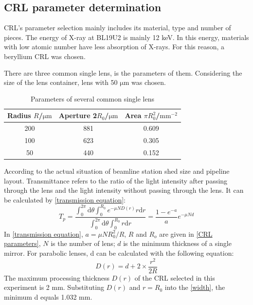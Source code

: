 \documentclass{Head}
\begin{document}
\subsection{CRL parameter determination}
CRL's parameter selection mainly includes its material, type and number of pieces.
The energy of X-ray at BL19U2 is mainly 12 keV.
In this energy, materials with low atomic number have less absorption of X-rays.
For this reason, a beryllium CRL was chosen.


There are three common single lens, is the parameters of them.
Considering the size of the lens container, lens with 50 $\mathrm{\mu m}$ was chosen.
\begin{table}
    \centering
    \caption{Parameters of several common single lens}
    \begin{tabular}{ccc}
        \toprule
        Radius $R$/$\mathrm{\mu m}$ & Aperture 2$R_0$/$\mathrm{\mu m}$ & Area $\pi R_0^2$/$\mathrm{mm^{-2}}$ \\
        \midrule
        200                         & 881                              & 0.609                               \\
        100                         & 623                              & 0.305                               \\
        50                          & 440                              & 0.152                               \\
        \bottomrule
    \end{tabular}
    \label{CRL parameters}
\end{table}

According to the actual situation of beamline station shed size and pipeline layout.
Transmittance refers to the ratio of the light intensity after passing through the lens and the light intensity without passing through the lens.
It can be calculated by \autoref{transmission equation}\cite{Lengeler:ht2006}:
\begin{equation}
    T_p=\frac{\int_0^{2\pi}\mathrm{d}\theta\int_0^{R_0}e^{-\mu ND(r)}r\mathrm{d}r}{\int_0^{2\pi}\mathrm{d}\theta\int_0^{R_0}r\mathrm{d}r}=\frac{1-e^{-a}}{a}e^{-\mu Nd}
    \label{transmission equation}
\end{equation}
In \autoref{transmission equation}, $a=\mu N R_0^2/R$, $R$ and $R_o$ are given in \autoref{CRL parameters}, $N$ is the number of lens; $d$ is the minimum thickness of a single mirror.
For parabolic lenses, d can be calculated with the following equation:
\begin{equation}
    D(r)=d+2\times \frac{r^2}{2R}
    \label{width}
\end{equation}
The maximum processing thickness $D(r)$ of the CRL selected in this experiment is 2 mm.
Substituting $D(r)$ and $r=R_0$ into the \autoref{width}, the minimum d equals 1.032 mm.
\end{document}
